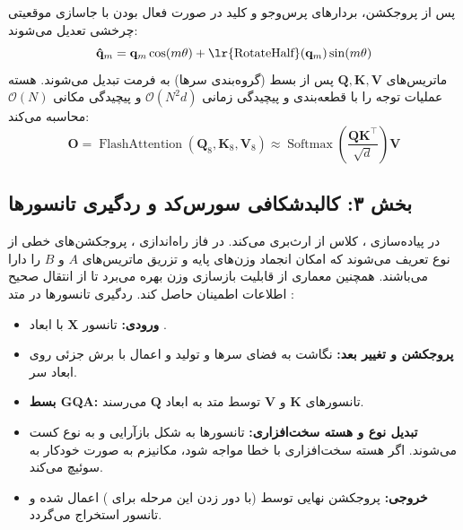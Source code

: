 پس از پروجکشن، بردارهای پرس‌وجو و کلید  در صورت فعال بودن با جاسازی موقعیتی چرخشی  تعدیل می‌شوند:
\begin{equation}
\mathbf{\hat{q}}_m = \mathbf{q}_m \cos(m \theta) + \text{\lr{RotateHalf}}(\mathbf{q}_m) \sin(m \theta)
\end{equation}
ماتریس‌های $\mathbf{Q}, \mathbf{K}, \mathbf{V}$ پس از بسط  (گروه‌بندی سرها) به فرمت  تبدیل می‌شوند. هسته  عملیات توجه را با قطعه‌بندی  و پیچیدگی زمانی $\mathcal{O}(N^2 d)$ و پیچیدگی مکانی $\mathcal{O}(N)$ محاسبه می‌کند:
\begin{equation}
\mathbf{O} = \operatorname{FlashAttention}(\mathbf{Q}_{8}, \mathbf{K}_{8}, \mathbf{V}_{8}) \approx \operatorname{Softmax}\left( \frac{\mathbf{Q} \mathbf{K}^\top}{\sqrt{d}} \right) \mathbf{V}
\end{equation}

\subsection*{بخش ۳: کالبدشکافی سورس‌کد و ردگیری تانسورها }
در پیاده‌سازی ، کلاس  از  ارث‌بری می‌کند.
در فاز راه‌اندازی ، پروجکشن‌های خطی از نوع  تعریف می‌شوند که امکان انجماد وزن‌های پایه  و تزریق ماتریس‌های $A$ و $B$ را دارا می‌باشند. همچنین معماری از قابلیت بازسازی وزن  بهره می‌برد تا از انتقال صحیح اطلاعات اطمینان حاصل کند.
ردگیری تانسورها در متد :
\begin{itemize}
    \item \textbf{ورودی:} تانسور $\mathbf{X}$ با ابعاد \lr{[B, N, D]}.
    \item \textbf{پروجکشن و تغییر بعد:} نگاشت به فضای سرها و تولید \lr{[B, H, N, d]} و اعمال  با برش جزئی روی ابعاد سر.
    \item \textbf{بسط GQA:} تانسورهای $\mathbf{K}$ و $\mathbf{V}$ توسط متد  به ابعاد $\mathbf{Q}$ می‌رسند.
    \item \textbf{تبدیل نوع و هسته سخت‌افزاری:} تانسورها به شکل \lr{[B, N, H, d]} بازآرایی و به نوع  کست  می‌شوند. اگر هسته سخت‌افزاری با خطا مواجه شود، مکانیزم  به صورت خودکار به   سوئیچ می‌کند.
    \item \textbf{خروجی:} پروجکشن نهایی توسط  (با دور زدن این مرحله برای ) اعمال شده و تانسور \lr{[B, N, D]} استخراج می‌گردد.
\end{itemize}

